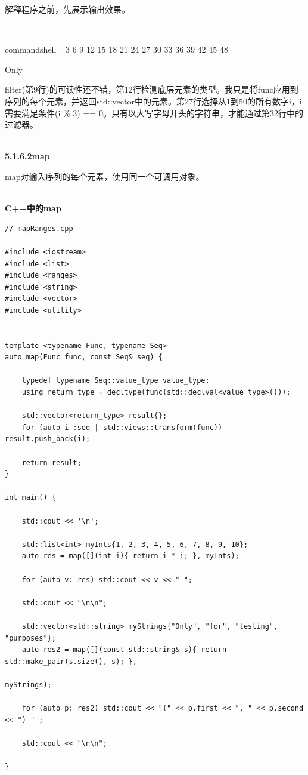 解释程序之前，先展示输出效果。

\hspace*{\fill} \\ %
\begin{tcblisting}{commandshell={}}
3 6 9 12 15 18 21 24 27 30 33 36 39 42 45 48

Only
\end{tcblisting}

filter(第9行)的可读性还不错，第12行检测底层元素的类型。我只是将func应用到序列的每个元素，并返回std::vector中的元素。第27行选择从1到50的所有数字i，i需要满足条件(i \% 3) == 0。只有以大写字母开头的字符串，才能通过第32行中的过滤器。

\hspace*{\fill} \\ %
\noindent
\textbf{5.1.6.2\hspace{0.2cm}map}

map对输入序列的每个元素，使用同一个可调用对象。

\hspace*{\fill} \\ %
\noindent
\textbf{C++中的map}
\begin{lstlisting}[style=styleCXX]
// mapRanges.cpp

#include <iostream>
#include <list>
#include <ranges>
#include <string>
#include <vector>
#include <utility>


template <typename Func, typename Seq>
auto map(Func func, const Seq& seq) {

	typedef typename Seq::value_type value_type;
	using return_type = decltype(func(std::declval<value_type>()));
	
	std::vector<return_type> result{};
	for (auto i :seq | std::views::transform(func)) result.push_back(i);
	
	return result;
}

int main() {

	std::cout << '\n';
	
	std::list<int> myInts{1, 2, 3, 4, 5, 6, 7, 8, 9, 10};
	auto res = map([](int i){ return i * i; }, myInts);
	
	for (auto v: res) std::cout << v << " ";
	
	std::cout << "\n\n";
	
	std::vector<std::string> myStrings{"Only", "for", "testing", "purposes"};
	auto res2 = map([](const std::string& s){ return std::make_pair(s.size(), s); },
	                                                                myStrings);
	
	for (auto p: res2) std::cout << "(" << p.first << ", " << p.second << ") " ;
	
	std::cout << "\n\n";

}
\end{lstlisting}

